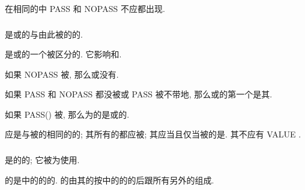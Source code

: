 在相同的\tit{\Procedure{}\Component{}\Attribute{}\Specifier{}\List{}}中 PASS 和 NOPASS 不应都出现.

\subsubsection{\PassedObjectDummyArgument{}}

\PassedObjectDummyArgument{}是\TypeBound{}\Procedure{}或\Procedure{}\Pointer{}\Component{}的与\Procedure{}由此被\Invoke{}的\Object{}\Associate{}的\DummyArgument{}.

\PassedObjectDummyArgument{}是\Procedure{}\Pointer{}\Component{}或\TypeBound{}\Procedure{}的一个被区分的\DummyArgument{}. 它影响\Procedure{}\Override{}和\ArgumentAssociation{}.

如果 NOPASS 被\Specify{}, 那么\Procedure{}\Pointer{}\Component{}或\TypeBound{}\Procedure{}没有\PassedObjectDummyArgument{}.

如果 PASS 和 NOPASS 都没被\Specify{}或 PASS 被不带\tit{\Argument{}\Name{}}地\Specify{}, 那么\Procedure{}\Pointer{}\Component{}或\TypeBound{}\Procedure{}的第一个\DummyArgument{}是其\PassedObjectDummyArgument{}.

如果 PASS(\tit{\Argument{}\Name{}}) 被\Specify{}, 那么\Name{}为\tit{\Argument{}\Name{}}的\DummyArgument{}是\Procedure{}\Pointer{}\Component{}或\Named{}\TypeBound{}\Procedure{}的\PassedObjectDummyArgument{}.

\PassedObjectDummyArgument{}应是与被\Define{}的\Type{}相同的的\Scalar{}\Nonpointer{}\Nonallocatable{}\Dummy{}\Data{}\Object{}; 其所有的\Length{}\TypeParameter{}都应被\Assume{}; 其应\Polymorphic{}当且仅当被\Define{}的\Type{}是\ExtensibleType{}. 其不应有 VALUE \Attribute{}.

\subsubsection{\Component{}\Order{}}

\TypeParameter{}\Order{}是\DerivedType{}的\TypeParameter{}的\Order{}; 它被为\DerivedType{}\Specifier{}使用.

\Nonextended{}\Type{}的\Component{}\Order{}是\DerivedType{}\Definition{}中的\Component{}的\Declaration{}的\Order{}. \Extended{}\Type{}的\Component{}\Order{}由其\Parent{}\Type{}的\Component{}\Order{}按\DerivedType{}\Definition{}中的\Component{}的\Declaration{}的\Order{}后跟所有另外的\Component{}组成.

\subsubsection{\TypeBound{}\Procedure{}}

